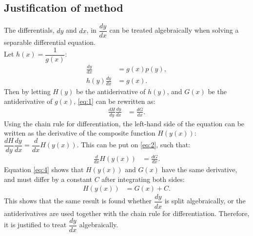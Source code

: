 \subsection{Justification of method} 
The differentials, $dy$ and $dx$, in $\dfrac{dy}{dx}$ can be treated algebraically when solving a separable differential equation. 
\\
Let $h(x) = \dfrac{1}{g(x)}$:
 \begin{align}
	\frac{dy}{dx} &= g(x)p(y), \nonumber\\
	h(y)\frac{dy}{dx} &= g(x). \label{eq:1}
 \end{align}
Then by letting $H(y)$ be the antiderivative of $h(y)$, and $G(x)$ be the antiderivative of $g(x)$, \eqref{eq:1} can be rewritten as: 
 \begin{align}
 	\frac{dH}{dy}\frac{dy}{dx} &= \frac{dG}{dx}. \label{eq:2}
 \end{align}
Using the chain rule for differentiation, the left-hand side of the equation can be written as the derivative of the composite function $H \left(y(x) \right)$: $\dfrac{dH}{dy}\dfrac{dy}{dx} =\dfrac{d}{dx} H \left(y(x) \right).$ This can be put on \eqref{eq:2}, such that:
 \begin{align}
 	\frac{d}{dx}H\left(y(x)\right) &= \frac{dG}{dx}\label{eq:4}.
 \end{align}
Equation \eqref{eq:4} shows that $H\left(y(x)\right)$ and $G(x)$ have the same derivative, and must differ by a constant $C$ after integrating both sides:
 \begin{align*}
 	H\left(y(x)\right) &= G(x) + C.
 \end{align*}
This shows that the same result is found whether $\dfrac{dy}{dx}$ is split algebraically, or the antiderivatives are used together with the chain rule for differentiation. Therefore, it is justified to treat $\dfrac{dy}{dx}$ algebraically.


